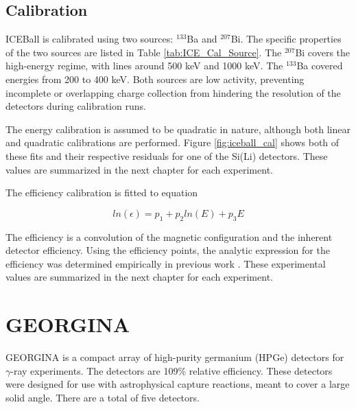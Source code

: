 



\subsection{Calibration}

ICEBall is calibrated using two sources: $^{133}$Ba and $^{207}$Bi. The specific properties of the two sources are listed in Table \ref{tab:ICE_Cal_Source}. The $^{207}$Bi covers the high-energy regime, with lines around 500 keV and 1000 keV. The $^{133}$Ba covered energies from 200 to 400 keV. Both sources are low activity, preventing incomplete or overlapping charge collection from hindering the resolution of the detectors during calibration runs. 



The energy calibration is assumed to be quadratic in nature, although both linear and quadratic calibrations are performed. Figure \ref{fig:iceball_cal} shows both of these fits and their respective residuals for one of the Si(Li) detectors. These values are summarized in the next chapter for each experiment.



The efficiency calibration is fitted to equation

\begin{equation}
    ln(\epsilon) = p_1+p_2ln(E)+p_3E
    \label{eq:SiLi_Eff}
\end{equation}

The efficiency is a convolution of the magnetic configuration and the inherent detector efficiency. Using the efficiency points, the analytic expression for the efficiency was determined empirically in previous work \citep{battaglia15:_iceball_176lu}. These experimental values are summarized in the next chapter for each experiment.

\section{GEORGINA}

GEORGINA is a compact array of high-purity germanium (HPGe) detectors for $\gamma$-ray experiments\citep{isnap18:_georgina}. The detectors are 109\% relative efficiency. These detectors were designed for use with astrophysical capture reactions, meant to cover a large solid angle. There are a total of five detectors.

